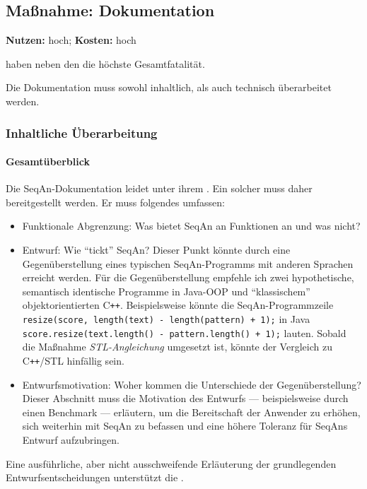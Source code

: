 \subsection{Maßnahme: Dokumentation}\label{sec:dox}
\textbf{Nutzen:} hoch; \textbf{Kosten:} hoch

 haben neben den  die höchste Gesamtfatalität.

Die Dokumentation muss sowohl inhaltlich, als auch technisch überarbeitet werden.

\subsubsection{Inhaltliche Überarbeitung}

\paragraph{Gesamtüberblick}

Die SeqAn-Dokumentation leidet unter ihrem . Ein solcher muss daher bereitgestellt werden. Er muss folgendes umfassen:
\begin{itemize}
  \item Funktionale Abgrenzung: Was bietet SeqAn an Funktionen an und was nicht?
  \item Entwurf: Wie ``tickt'' SeqAn? Dieser Punkt könnte durch eine Gegenüberstellung eines typischen SeqAn-Programms mit anderen Sprachen erreicht werden. Für die Gegenüberstellung empfehle ich zwei hypothetische, semantisch identische Programme in Java-OOP und ``klassischem'' objektorientierten C\texttt{++}. Beispielsweise könnte die SeqAn-Programmzeile \texttt{resize(score, length(text) - length(pattern) + 1);} in Java \texttt{score.resize(text.length() - pattern.length() + 1);} lauten. Sobald die Maßnahme \textit{STL-Angleichung} umgesetzt ist, könnte der Vergleich zu C\texttt{++}/STL hinfällig sein.
  \item Entwurfsmotivation: Woher kommen die Unterschiede der Gegenüberstellung? Dieser Abschnitt muss die Motivation des Entwurfs --- beispielsweise durch einen Benchmark --- erläutern, um die Bereitschaft der Anwender zu erhöhen, sich weiterhin mit SeqAn zu befassen und eine höhere Toleranz für SeqAns Entwurf aufzubringen.
\end{itemize}

Eine ausführliche, aber nicht ausschweifende Erläuterung der grundlegenden Entwurfsentscheidungen unterstützt die  .
    
